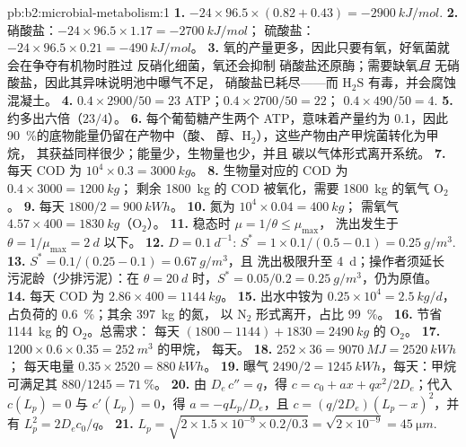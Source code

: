 \begin{solution}{pb:b2:microbial-metabolism:1}
\textbf{1.} $-24\times 96.5\times (0.82 + 0.43) = \qty{-2900}{kJ/mol}$.
\textbf{2.} 硝酸盐：$-24\times 96.5\times 1.17 = \qty{-2700}{kJ/mol}$；
硫酸盐：$-24\times 96.5\times 0.21 = \qty{-490}{kJ/mol}$。
\textbf{3.} 氧的产量更多，因此只要有氧，好氧菌就会在争夺有机物时胜过
反硝化细菌，氧还会抑制
硝酸盐还原酶；需要缺氧\emph{且}
无硝酸盐，因此其异味说明池中曝气不足，
硝酸盐已耗尽——而 $\mathrm{H_2S}$ 有毒，并会腐蚀
混凝土。
\textbf{4.} $0.4\times 2900/50 = 23$ ATP；$0.4\times 2700/50 = 22$；
$0.4\times 490/50 = 4$.
\textbf{5.} 约多出六倍（$23/4$）。
\textbf{6.} 每个葡萄糖产生两个 ATP，意味着产量约为 \num{0.1}，因此
\qty{90}{\%}的底物能量仍留在产物中（酸、
醇、$\mathrm{H_2}$），这些产物由产甲烷菌转化为甲烷，
其获益同样很少；能量少，生物量也少，并且
碳以气体形式离开系统。
\textbf{7.} 每天 COD 为 $10^4\times 0.3 = \qty{3000}{kg}$。
\textbf{8.} 生物量对应的 COD 为 $0.4\times 3000 = \qty{1200}{kg}$；
剩余 \qty{1800}{kg} 的 COD 被氧化，需要 \qty{1800}{kg}
的氧气 $\mathrm{O_2}$。
\textbf{9.} 每天 $1800/2 = \qty{900}{kWh}$。
\textbf{10.} 氮为 $10^4\times 0.04 = \qty{400}{kg}$；
需氧气 $4.57\times 400 = \qty{1830}{kg}$（$\mathrm{O_2}$）。
\textbf{11.} 稳态时 $\mu = 1/\theta \le \mu_{\max}$，
洗出发生于 $\theta = 1/\mu_{\max} = \qty{2}{d}$ 以下。
\textbf{12.} $D = \qty{0.1}{d^{-1}}$: $S^* = 1\times 0.1/(0.5 - 0.1)
= \qty{0.25}{g/m^3}$.
\textbf{13.} $S^* = 0.1/(0.25 - 0.1) = \qty{0.67}{g/m^3}$，且
洗出极限升至 \qty{4}{d}；操作者须延长
污泥龄（少排污泥）：在 $\theta = \qty{20}{d}$ 时，$S^* =
0.05/0.2 = \qty{0.25}{g/m^3}$，仍为原值。
\textbf{14.} 每天 COD 为 $2.86\times 400 = \qty{1144}{kg}$。
\textbf{15.} 出水中铵为 $0.25\times 10^4 = \qty{2.5}{kg/d}$，
占负荷的 \qty{0.6}{\%}；其余 \qty{397}{kg} 的氮，
以 $\mathrm{N_2}$ 形式离开，占比 \qty{99}{\%}。
\textbf{16.} 节省 \qty{1144}{kg} 的 $\mathrm{O_2}$。总需求：
每天 $(1800 - 1144) + 1830 = \qty{2490}{kg}$ 的 $\mathrm{O_2}$。
\textbf{17.} $1200\times 0.6\times 0.35 = \qty{252}{m^3}$ 的甲烷，
每天。
\textbf{18.} $252\times 36 = \qty{9070}{MJ} = \qty{2520}{kWh}$；
每天电量 $0.35\times 2520 = \qty{880}{kWh}$。
\textbf{19.} 曝气 $2490/2 = \qty{1245}{kWh}$，每天：甲烷
可满足其 $880/1245 = \qty{71}{\%}$。
\textbf{20.} 由 $D_e\,c'' = q$，得 $c = c_0 + ax + qx^2/2D_e$；代入
$c(L_p) = 0$ 与 $c'(L_p) = 0$，得 $a = -qL_p/D_e$，且 $c =
(q/2D_e)(L_p - x)^2$，并有 $L_p^2 = 2D_ec_0/q$。
\textbf{21.} $L_p = \sqrt{2\times 1.5\times 10^{-9}\times 0.2/0.3} =
\sqrt{2\times 10^{-9}} = \qty{45}{\micro m}$.

\end{solution}
